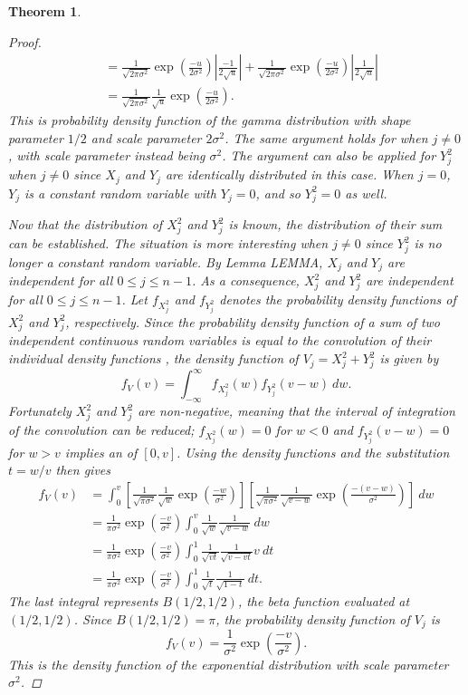 \documentclass[12pt]{article}
\newcommand{\noiseSD}{\sigma}	%
\newtheorem{theorem}{Theorem}[section]
\begin{document}
\begin{theorem}
\begin{proof}
\begin{align*}
&= \frac{1}{\sqrt{2\pi\noiseSD^2}}\exp\left(\frac{-u}{2\noiseSD^2}\right)\left|\frac{-1}{2\sqrt{u}}\right| + \frac{1}{\sqrt{2\pi\noiseSD^2}}\exp\left(\frac{-u}{2\noiseSD^2}\right)\left|\frac{1}{2\sqrt{u}}\right| \\
&= \frac{1}{\sqrt{2\pi\noiseSD^2}} \frac{1}{\sqrt{u}} \exp\left(\frac{-u}{2\noiseSD^2}\right).
\end{align*}
This is probability density function of the gamma distribution with shape parameter $1/2$ and scale parameter $2\noiseSD^2$. The same argument holds for when $j \neq 0$, with scale parameter instead being $\noiseSD^2$. The argument can also be applied for $Y_j^2$ when $j \neq 0$ since $X_j$ and $Y_j$ are identically distributed in this case. When $j = 0$, $Y_j$ is a constant random variable with $Y_j = 0$, and so $Y_j^2 = 0$ as well. \par 
Now that the distribution of $X_j^2$ and $Y_j^2$ is known, the distribution of their sum can be established. The situation is more interesting when $j \neq 0$ since $Y_j^2$ is no longer a constant random variable. By Lemma LEMMA, $X_j$ and $Y_j$ are independent for all $0 \leq j \leq n-1$. As a consequence, $X_j^2$ and $Y_j^2$ are independent for all $0 \leq j \leq n-1$. Let $f_{X_j^2}$ and $f_{Y_j^2}$ denotes the probability density functions of $X_j^2$ and $Y_j^2$, respectively. Since the probability density function of a sum of two independent continuous random variables is equal to the convolution of their individual density functions \cite{CasellaBerger02}, the density function of $V_j = X_j^2 + Y_j^2$ is given by 
\[f_V(v) = \int_{-\infty}^{\infty} f_{X_j^2}(w)f_{Y_j^2}(v-w) \: dw.\]
Fortunately $X_j^2$ and $Y_j^2$ are non-negative, meaning that the interval of integration of the convolution can be reduced; $f_{X_j^2}(w) = 0$ for $w < 0$ and $f_{Y_j^2}(v-w) = 0$ for $w > v$ implies an of $[0,v]$. Using the density functions and the substitution $t = w/v$ then gives
\begin{align*}
f_V(v) &= \int_0^v \left[\frac{1}{\sqrt{\pi\noiseSD^2}} \frac{1}{\sqrt{w}} \exp\left(\frac{-w}{\noiseSD^2}\right)\right]\left[\frac{1}{\sqrt{\pi\noiseSD^2}} \frac{1}{\sqrt{v-w}} \exp\left(\frac{-(v-w)}{\noiseSD^2}\right)\right] \: dw \\
&= \frac{1}{\pi\noiseSD^2} \exp\left(\frac{-v}{\noiseSD^2}\right) \int_0^v \frac{1}{\sqrt{w}} \frac{1}{\sqrt{v-w}} \: dw \\
&= \frac{1}{\pi\noiseSD^2} \exp\left(\frac{-v}{\noiseSD^2}\right) \int_0^1 \frac{1}{\sqrt{vt}} \frac{1}{\sqrt{v-vt}}v \: dt \\
&= \frac{1}{\pi\noiseSD^2} \exp\left(\frac{-v}{\noiseSD^2}\right) \int_0^1 \frac{1}{\sqrt{t}} \frac{1}{\sqrt{1-t}} \: dt.
\end{align*}
The last integral represents $B(1/2,1/2)$, the beta function evaluated at $(1/2,1/2)$. Since $B(1/2,1/2) = \pi$, the probability density function of $V_j$ is
\[f_V(v) = \frac{1}{\noiseSD^2} \exp\left(\frac{-v}{\noiseSD^2}\right).\]
This is the density function of the exponential distribution with scale parameter $\noiseSD^2$.
\end{proof}
\end{theorem}
\end{document}

